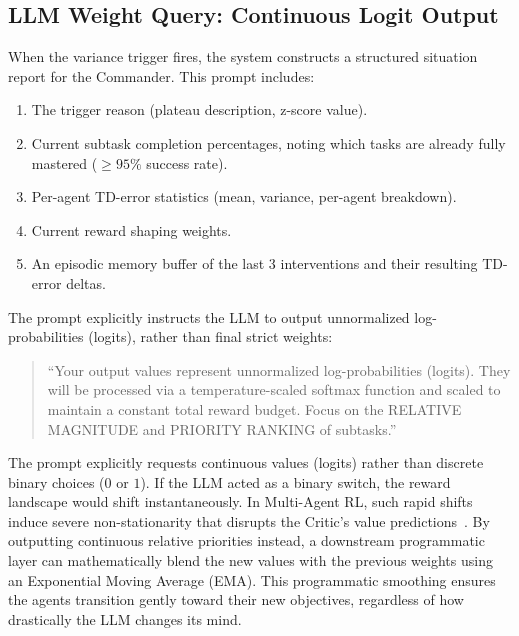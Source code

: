 \subsection{LLM Weight Query: Continuous Logit Output}
\label{sec:llm_weight_query}

When the variance trigger fires, the system constructs a structured situation report for the Commander. This prompt includes:

\begin{enumerate}
    \item The trigger reason (plateau description, z-score value).
    \item Current subtask completion percentages, noting which tasks are already fully mastered ($\ge 95\%$ success rate).
    \item Per-agent TD-error statistics (mean, variance, per-agent breakdown).
    \item Current reward shaping weights.
    \item An episodic memory buffer of the last 3 interventions and their resulting TD-error deltas.
\end{enumerate}

The prompt explicitly instructs the LLM to output unnormalized log-probabilities (logits), rather than final strict weights:

\begin{quote}
\small\sffamily
``Your output values represent unnormalized log-probabilities (logits).
They will be processed via a temperature-scaled softmax function and
scaled to maintain a constant total reward budget.
Focus on the RELATIVE MAGNITUDE and PRIORITY RANKING of subtasks.''
\end{quote}

The prompt explicitly requests continuous values (logits) rather than discrete binary choices ($0$ or $1$). If the LLM acted as a binary switch, the reward landscape would shift instantaneously. In Multi-Agent RL, such rapid shifts induce severe non-stationarity that disrupts the Critic's value predictions~\parencite{Foerster_Nardelli_Farquhar_Afouras_Torr_Kohli_Whiteson_2017}. By outputting continuous relative priorities instead, a downstream programmatic layer can mathematically blend the new values with the previous weights using an Exponential Moving Average (EMA). This programmatic smoothing ensures the agents transition gently toward their new objectives, regardless of how drastically the LLM changes its mind.

